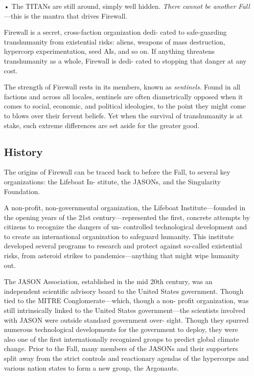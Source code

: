 •  The TITANs are still around, simply well hidden. 
\textit{There cannot be another Fall}—this is the mantra that 
drives Firewall. 

Firewall is a secret, cross-faction organization dedi-
cated to safe-guarding transhumanity from existential 
risks: aliens, weapons of mass destruction, hypercorp 
experimentation, seed AIs, and so on. If anything 
threatens transhumanity as a whole, Firewall is dedi-
cated to stopping that danger at any cost. 

The strength of Firewall rests in its members, known 
as \textit{sentinels.} Found in all factions and across all locales, 
sentinels are often diametrically opposed when it comes 
to social, economic, and political ideologies, to the point 
they might come to blows over their fervent beliefs. Yet 
when the survival of transhumanity is at stake, such 
extreme differences are set aside for the greater good. 

\subsection{History}

The origins of Firewall can be traced back to before 
the Fall, to several key organizations: the Lifeboat In-
stitute, the JASONs, and the Singularity Foundation. 

A non-profit, non-governmental organization, the 
Lifeboat Institute—founded in the opening years 
of the 21st century—represented the first, concrete 
attempts by citizens to recognize the dangers of un-
controlled technological development and to create 
an international organization to safeguard humanity. 
This institute developed several programs to research 
and protect against so-called existential risks, from 
asteroid strikes to pandemics—anything that might 
wipe humanity out.

The JASON Association, established in the mid 
20th century, was an independent scientific advisory 
board to the United States government. Though tied 
to the MITRE Conglomerate—which, though a non-
profit organization, was still intrinsically linked to 
the United States government—the scientists involved 
with JASON were outside standard government over-
sight. Though they spurred numerous technological 
developments for the government to deploy, they were 
also one of the first internationally recognized groups 
to predict global climate change. Prior to the Fall, 
many members of the JASONs and their supporters 
split away from the strict controls and reactionary 
agendas of the hypercorps and various nation states 
to form a new group, the Argonauts.

